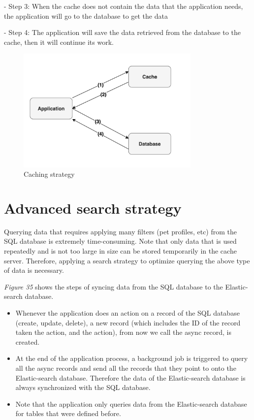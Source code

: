 - Step 3: When the cache does not contain the data that the application
needs, the application will go to the database to get the data

- Step 4: The application will save the data retrieved from the database
to the cache, then it will continue its work.

\begin{figure}[H]
    \centering
    \includegraphics[width=0.8\textwidth]{Figures/caching_strat.png}
    \caption{Caching strategy}
\end{figure}

\section{Advanced search strategy}

Querying data that requires applying many filters (pet profiles, etc)
from the SQL database is extremely time-consuming. Note that only data
that is used repeatedly and is not too large in size can be stored
temporarily in the cache server. Therefore, applying a search strategy
to optimize querying the above type of data is necessary.

\emph{Figure 35} shows the steps of syncing data from the SQL database
to the Elastic-search database.

\begin{itemize}
    \item
          Whenever the application does an action on a record of the SQL
          database (create, update, delete), a new record (which includes the ID
          of the record taken the action, and the action), from now we call the
          async record, is created.
    \item
          At the end of the application process, a background job is triggered
          to query all the async records and send all the records that they
          point to onto the Elastic-search database. Therefore the data of the
          Elastic-search database is always synchronized with the SQL database.
    \item
          Note that the application only queries data from the Elastic-search
          database for tables that were defined before.
\end{itemize}

